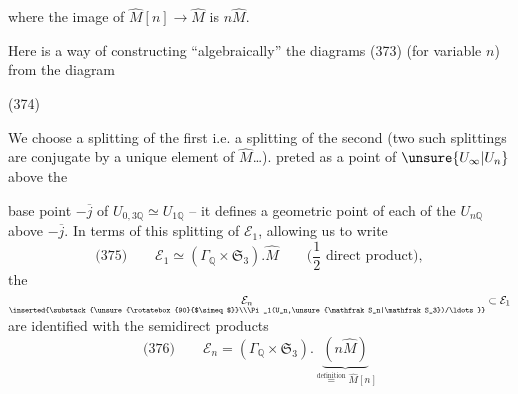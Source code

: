 where the image of $\widehat M[n]\longrightarrow\widehat M$ is $n\widehat M$.

Here is  a way of constructing ``algebraically'' the diagrams (373) (for variable $n$) from the diagram

\noindent (374)

We choose a  splitting of the first i.e. a splitting of the second (two such splittings are conjugate by a unique element of $\widehat M$\ldots).
 preted as a  point of $\unsure{U_\infty|U_n}$ above the


base point $-\overline j$ of $U_{0,3\mathbb Q}\simeq U_{1\mathbb Q}$ -- it defines a geometric point of each of the $U_{n\mathbb Q}$ above $-\overline j$. In terms of this splitting of $\mathcal E_1$, allowing us to write
\[
\text{(375)}\qquad \mathcal E_1\simeq(\Gamma_{\mathbb Q}\times\mathfrak S_3).\widehat M
\qquad\text{($\frac12$ direct product)},
\]
the $\underset{\inserted{\substack{\unsure{\rotatebox{90}{$\simeq$}}\\\Pi_1(U_n,\unsure{\mathfrak S_n|\mathfrak S_3})/\ldots}}}{\mathcal E_n}\subset\mathcal E_1$ are identified with the semidirect products
\[
\text{(376)}\qquad \mathcal E_n=(\Gamma_{\mathbb Q}\times\mathfrak S_3).
\underbrace{(n\widehat M)}_{\overset{\text{definition}}{=}\widehat M[n]}
\]


